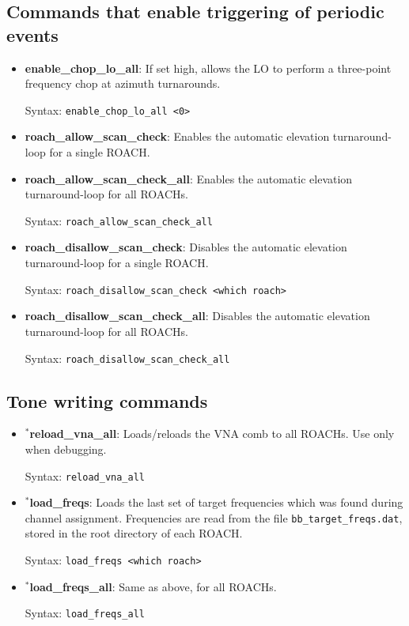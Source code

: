 \subsection{Commands that enable triggering of periodic events}

\begin{itemize}[leftmargin=*,label={}]

\item \textbf{enable\_chop\_lo\_all}: If set high, allows the LO to perform a three-point frequency chop at azimuth turnarounds.

Syntax: \texttt{enable\_chop\_lo\_all <0>}

\item \textbf{roach\_allow\_scan\_check}: Enables the automatic elevation turnaround-loop for a single ROACH.

\item \textbf{roach\_allow\_scan\_check\_all}: Enables the automatic elevation turnaround-loop for all ROACHs.

Syntax: \texttt{roach\_allow\_scan\_check\_all}

\item \textbf{roach\_disallow\_scan\_check}: Disables the automatic elevation turnaround-loop for a single ROACH.

Syntax: \texttt{roach\_disallow\_scan\_check <which roach>}

\item \textbf{roach\_disallow\_scan\_check\_all}: Disables the automatic elevation turnaround-loop for all ROACHs.

Syntax: \texttt{roach\_disallow\_scan\_check\_all}

\end{itemize}

\subsection{Tone writing commands}
\begin{itemize}[leftmargin=*,label={}]

\item $^{*}$\textbf{reload\_vna\_all}: Loads/reloads the VNA comb to all ROACHs. Use only when debugging.

Syntax: \texttt{reload\_vna\_all}

\item $^{*}$\textbf{load\_freqs}: Loads the last set of target frequencies which was found during channel assignment. Frequencies are read from the file \texttt{bb\_target\_freqs.dat}, stored in the root directory of each ROACH.

Syntax: \texttt{load\_freqs <which roach>}

\item $^{*}$\textbf{load\_freqs\_all}: Same as above, for all ROACHs.

Syntax: \texttt{load\_freqs\_all}

\end{itemize}

